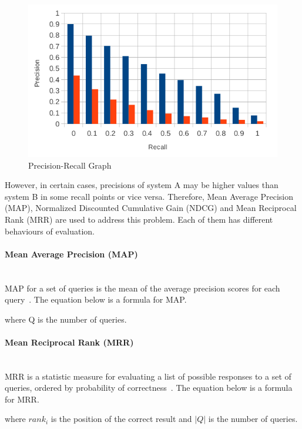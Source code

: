 \begin{figure}
\centering
\includegraphics[scale=0.5]{./figures/pr_example.png}
\caption{Precision-Recall Graph} \label{fig:pr_example} 
\end{figure}

However, in certain cases, precisions of system A may be higher values than system B in some recall points or vice versa. Therefore,
Mean Average Precision (MAP), Normalized Discounted Cumulative Gain (NDCG) and Mean Reciprocal Rank (MRR) are used to address this problem.
Each of them has different behaviours of evaluation.

\paragraph{Mean Average Precision (MAP)} \hspace{0pt} \\
MAP for a set of queries is the mean of the average precision scores for each query~\cite{IR}. The equation below is
a formula for MAP.
\begin{center}
\end{center}
where Q is the number of queries.

\paragraph{Mean Reciprocal Rank (MRR)} \hspace{0pt} \\
MRR is a statistic measure for evaluating a list of possible responses to a set of queries, ordered by 
probability of correctness~\cite{mrr}. The equation below is a formula for MRR.
\begin{center}
\end{center}
where $rank_i$ is the position of the correct result and $|Q|$ is the number of queries.

